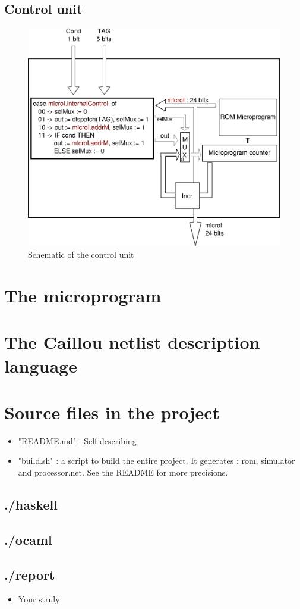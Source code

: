 \documentclass[a4paper, 11pt]{article}
\begin{document}
\subsection{Control unit}
\begin{figure}[h]
\center
\caption{Schematic of the control unit}
   \includegraphics[scale=0.5]{control.eps}
\end{figure}


\section{The microprogram}


\section{The Caillou netlist description language}


\section{Source files in the project}
\begin{itemize}
\item "README.md" : Self describing
\item "build.sh" : a script to build the entire project. It generates : rom,
simulator and processor.net. See the README for more precisions.
\end{itemize}
\subsection{./haskell}

\subsection{./ocaml}

\subsection{./report}
\begin{itemize}
\item Your struly
\end{itemize}




\end{document}
